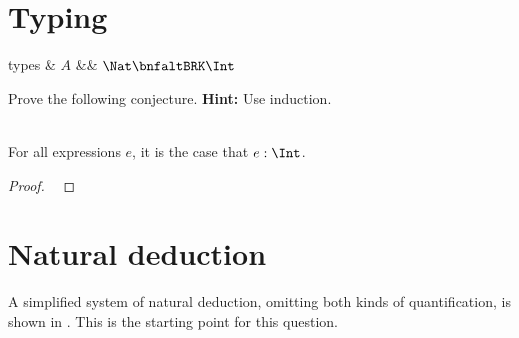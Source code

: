 \section{Typing}

\begin{grammar}
  types & $A$ &\bnfas& $\Nat \bnfaltBRK \Int$
\end{grammar}


\medskip

Prove the following conjecture.
\textbf{Hint:} Use induction.

\begin{conjecture} ~\\
  For all expressions $e$,
  it is the case that $e : \Int$.
\end{conjecture}
\begin{proof} ~

  \vfill
\end{proof}


\clearpage

\section{Natural deduction}

A simplified system of natural deduction, omitting both kinds of quantification, 
is shown in .  This is the starting point for this question.

